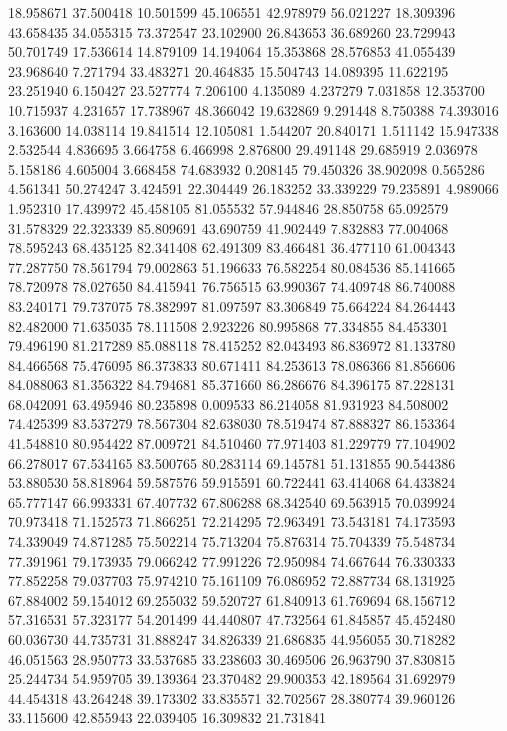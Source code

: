 18.958671
37.500418
10.501599
45.106551
42.978979
56.021227
18.309396
43.658435
34.055315
73.372547
23.102900
26.843653
36.689260
23.729943
50.701749
17.536614
14.879109
14.194064
15.353868
28.576853
41.055439
23.968640
7.271794
33.483271
20.464835
15.504743
14.089395
11.622195
23.251940
6.150427
23.527774
7.206100
4.135089
4.237279
7.031858
12.353700
10.715937
4.231657
17.738967
48.366042
19.632869
9.291448
8.750388
74.393016
3.163600
14.038114
19.841514
12.105081
1.544207
20.840171
1.511142
15.947338
2.532544
4.836695
3.664758
6.466998
2.876800
29.491148
29.685919
2.036978
5.158186
4.605004
3.668458
74.683932
0.208145
79.450326
38.902098
0.565286
4.561341
50.274247
3.424591
22.304449
26.183252
33.339229
79.235891
4.989066
1.952310
17.439972
45.458105
81.055532
57.944846
28.850758
65.092579
31.578329
22.323339
85.809691
43.690759
41.902449
7.832883
77.004068
78.595243
68.435125
82.341408
62.491309
83.466481
36.477110
61.004343
77.287750
78.561794
79.002863
51.196633
76.582254
80.084536
85.141665
78.720978
78.027650
84.415941
76.756515
63.990367
74.409748
86.740088
83.240171
79.737075
78.382997
81.097597
83.306849
75.664224
84.264443
82.482000
71.635035
78.111508
2.923226
80.995868
77.334855
84.453301
79.496190
81.217289
85.088118
78.415252
82.043493
86.836972
81.133780
84.466568
75.476095
86.373833
80.671411
84.253613
78.086366
81.856606
84.088063
81.356322
84.794681
85.371660
86.286676
84.396175
87.228131
68.042091
63.495946
80.235898
0.009533
86.214058
81.931923
84.508002
74.425399
83.537279
78.567304
82.638030
78.519474
87.888327
86.153364
41.548810
80.954422
87.009721
84.510460
77.971403
81.229779
77.104902
66.278017
67.534165
83.500765
80.283114
69.145781
51.131855
90.544386
53.880530
58.818964
59.587576
59.915591
60.722441
63.414068
64.433824
65.777147
66.993331
67.407732
67.806288
68.342540
69.563915
70.039924
70.973418
71.152573
71.866251
72.214295
72.963491
73.543181
74.173593
74.339049
74.871285
75.502214
75.713204
75.876314
75.704339
75.548734
77.391961
79.173935
79.066242
77.991226
72.950984
74.667644
76.330333
77.852258
79.037703
75.974210
75.161109
76.086952
72.887734
68.131925
67.884002
59.154012
69.255032
59.520727
61.840913
61.769694
68.156712
57.316531
57.323177
54.201499
44.440807
47.732564
61.845857
45.452480
60.036730
44.735731
31.888247
34.826339
21.686835
44.956055
30.718282
46.051563
28.950773
33.537685
33.238603
30.469506
26.963790
37.830815
25.244734
54.959705
39.139364
23.370482
29.900353
42.189564
31.692979
44.454318
43.264248
39.173302
33.835571
32.702567
28.380774
39.960126
33.115600
42.855943
22.039405
16.309832
21.731841
